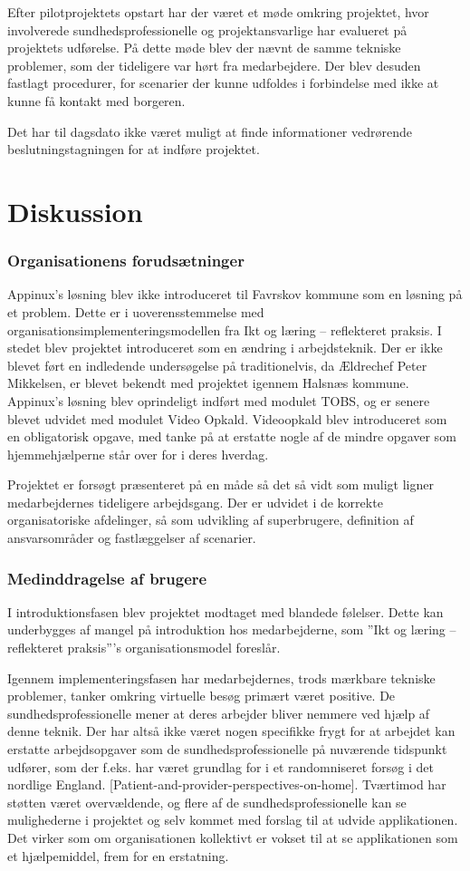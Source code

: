 Efter pilotprojektets opstart har der været et møde omkring projektet, hvor involverede sundhedsprofessionelle og projektansvarlige har evalueret på projektets udførelse. På dette møde blev der nævnt de samme tekniske problemer, som der tideligere var hørt fra medarbejdere. Der blev desuden fastlagt procedurer, for scenarier der kunne udfoldes i forbindelse med ikke at kunne få kontakt med borgeren. 

Det har til dagsdato ikke været muligt at finde informationer vedrørende beslutningstagningen for at indføre projektet.

  
\section{Diskussion}
\subsubsection{Organisationens forudsætninger}
Appinux’s løsning blev ikke introduceret til Favrskov kommune som en løsning på et problem. Dette er i uoverensstemmelse med organisationsimplementeringsmodellen fra Ikt og læring – reflekteret praksis. I stedet blev projektet introduceret som en ændring i arbejdsteknik. Der er ikke blevet ført en indledende undersøgelse på traditionelvis, da Ældrechef Peter Mikkelsen, er blevet bekendt med projektet igennem Halsnæs kommune. Appinux’s løsning blev oprindeligt indført med modulet TOBS, og er senere blevet udvidet med modulet Video Opkald. Videoopkald blev introduceret som en obligatorisk opgave, med tanke på at erstatte nogle af de mindre opgaver som hjemmehjælperne står over for i deres hverdag. 

Projektet er forsøgt præsenteret på en måde så det så vidt som muligt ligner medarbejdernes tideligere arbejdsgang. Der er udvidet i de korrekte organisatoriske afdelinger, så som udvikling af superbrugere, definition af ansvarsområder og fastlæggelser af scenarier. 

\subsubsection{Medinddragelse af brugere}
I introduktionsfasen blev projektet modtaget med blandede følelser. Dette kan underbygges af mangel på introduktion hos medarbejderne, som ”Ikt og læring – reflekteret praksis”’s organisationsmodel foreslår. 

Igennem implementeringsfasen har medarbejdernes, trods mærkbare tekniske problemer, tanker omkring virtuelle besøg primært været positive. De sundhedsprofessionelle mener at deres arbejder bliver nemmere ved hjælp af denne teknik. Der har altså ikke været nogen specifikke frygt for at arbejdet kan erstatte arbejdsopgaver som de sundhedsprofessionelle på nuværende tidspunkt udfører, som der f.eks. har været grundlag for i et randomniseret forsøg i det nordlige England. [Patient-and-provider-perspectives-on-home]. Tværtimod har støtten været overvældende, og flere af de sundhedsprofessionelle kan se mulighederne i projektet og selv kommet med forslag til at udvide applikationen. Det virker som om organisationen kollektivt er vokset til at se applikationen som et hjælpemiddel, frem for en erstatning.

